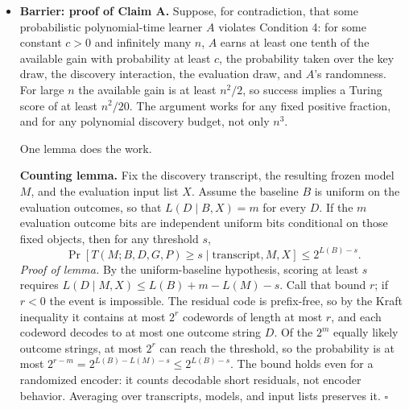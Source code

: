 \documentclass[11pt]{article}
\begin{document}
\begin{itemize}
\item \textbf{Barrier: proof of Claim A.} Suppose, for contradiction, that some probabilistic polynomial-time learner $A$ violates Condition 4: for some constant $c > 0$ and infinitely many $n$, $A$ earns at least one tenth of the available gain with probability at least $c$, the probability taken over the key draw, the discovery interaction, the evaluation draw, and $A$'s randomness. For large $n$ the available gain is at least $n^2/2$, so success implies a Turing score of at least $n^2/20$. The argument works for any fixed positive fraction, and for any polynomial discovery budget, not only $n^3$.

One lemma does the work.

\textbf{Counting lemma.} Fix the discovery transcript, the resulting frozen model $M$, and the evaluation input list $X$. Assume the baseline $B$ is uniform on the evaluation outcomes, so that $L(D \mid B, X) = m$ for every $D$. If the $m$ evaluation outcome bits are independent uniform bits conditional on those fixed objects, then for any threshold $s$,
\[
\Pr[T(M;B,D,G,P) \ge s \mid \text{transcript}, M, X] \le 2^{L(B) - s}.
\]
\emph{Proof of lemma.} By the uniform-baseline hypothesis, scoring at least $s$ requires $L(D \mid M, X) \le L(B) + m - L(M) - s$. Call that bound $r$; if $r < 0$ the event is impossible. The residual code is prefix-free, so by the Kraft inequality it contains at most $2^r$ codewords of length at most $r$, and each codeword decodes to at most one outcome string $D$. Of the $2^m$ equally likely outcome strings, at most $2^r$ can reach the threshold, so the probability is at most $2^{r-m} = 2^{L(B) - L(M) - s} \le 2^{L(B) - s}$. The bound holds even for a randomized encoder: it counts decodable short residuals, not encoder behavior. Averaging over transcripts, models, and input lists preserves it. \hfill$\square$


\end{itemize}
\end{document}

